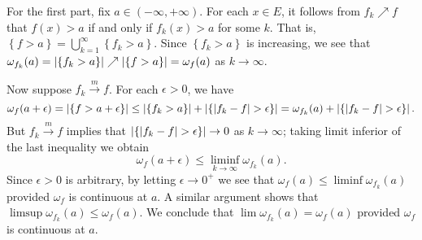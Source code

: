 \begin{exercise}{4.18}
  For the first part, fix $a \in (-\infty, +\infty)$.
  For each $x \in E$,
  it follows from $f_k \nearrow f$ that
  $f(x) > a$ if and only if $f_k(x) > a$ for some $k$.
  That is, $\left\{ f > a \right\} = \bigcup_{k=1}^{\infty} \left\{ f_k > a \right\}$.
  Since $\left\{ f_k > a \right\}$ is increasing,
  we see that $\omega_{f_k}(a) = \left\vert\left\{ f_k > a \right\}\right\vert \nearrow
  \left\vert\left\{ f > a \right\}\right\vert = \omega_f(a)$ as $k \rightarrow \infty$.

  Now suppose $f_k \xrightarrow{m} f$.
  For each $\epsilon > 0$, we have
  \[
    \omega_f(a + \epsilon) = \left\vert\left\{ f > a + \epsilon \right\}\right\vert \le
    \left\vert\left\{ f_k > a \right\}\right\vert + \left\vert\left\{ \lvert f_k - f \rvert > \epsilon \right\}\right\vert
    = \omega_{f_k}(a) + \left\vert\left\{ \lvert f_k - f \rvert > \epsilon \right\}\right\vert.
  \]
  But $f_k \xrightarrow{m} f$ implies that
  $\left\vert\left\{ \lvert f_k - f \rvert > \epsilon \right\}\right\vert \rightarrow 0$
  as $k \rightarrow \infty$;
  taking limit inferior of the last inequality we obtain
  \[
    \omega_f(a + \epsilon) \le \liminf_{k \rightarrow \infty} \omega_{f_k}(a).
  \]
  Since $\epsilon > 0$ is arbitrary,
  by letting $\epsilon \rightarrow 0^+$ we see that
  $\omega_f(a) \le \liminf \omega_{f_k}(a)$
  provided $\omega_f$ is continuous at $a$.
  A similar argument shows that $\limsup \omega_{f_k}(a) \le \omega_f(a)$.
  We conclude that $\lim \omega_{f_k}(a) = \omega_f(a)$
  provided $\omega_f$ is continuous at $a$.
\end{exercise}
